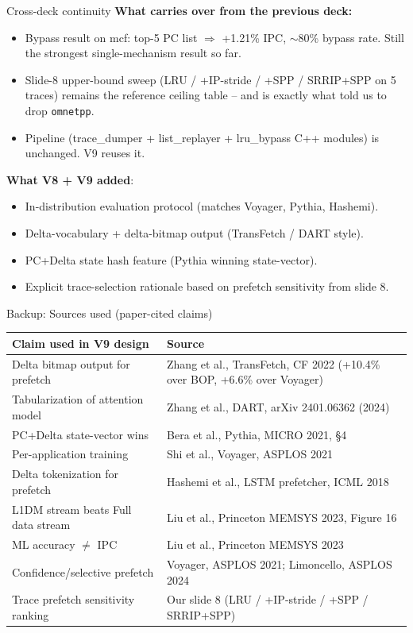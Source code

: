 \documentclass[10pt,aspectratio=169]{beamer}
\begin{document}
\begin{frame}{Cross-deck continuity}
  \footnotesize
  \textbf{What carries over from the previous deck:}
  \begin{itemize}\small
    \item Bypass result on mcf: top-5 PC list $\Rightarrow$ +1.21\% IPC, $\sim$80\% bypass rate.
      Still the strongest single-mechanism result so far.
    \item Slide-8 upper-bound sweep (LRU / +IP-stride / +SPP / SRRIP+SPP on 5 traces) remains
      the reference ceiling table -- and is exactly what told us to drop \texttt{omnetpp}.
    \item Pipeline (trace\_dumper + list\_replayer + lru\_bypass C++ modules) is unchanged.
      V9 reuses it.
  \end{itemize}

  \vspace{0.6em}
  \textbf{What V8 + V9 added}:
  \begin{itemize}\small
    \item In-distribution evaluation protocol (matches Voyager, Pythia, Hashemi).
    \item Delta-vocabulary + delta-bitmap output (TransFetch / DART style).
    \item PC+Delta state hash feature (Pythia winning state-vector).
    \item Explicit trace-selection rationale based on prefetch sensitivity from slide 8.
  \end{itemize}
\end{frame}

\begin{frame}{Backup: Sources used (paper-cited claims)}
  \scriptsize
  \begin{tabular}{ll}
    \toprule
    \textbf{Claim used in V9 design} & \textbf{Source} \\
    \midrule
    Delta bitmap output for prefetch    & Zhang et al., TransFetch, CF 2022 (+10.4\% over BOP, +6.6\% over Voyager) \\
    Tabularization of attention model   & Zhang et al., DART, arXiv 2401.06362 (2024) \\
    PC+Delta state-vector wins          & Bera et al., Pythia, MICRO 2021, \S 4 \\
    Per-application training            & Shi et al., Voyager, ASPLOS 2021 \\
    Delta tokenization for prefetch     & Hashemi et al., LSTM prefetcher, ICML 2018 \\
    L1DM stream beats Full data stream  & Liu et al., Princeton MEMSYS 2023, Figure 16 \\
    ML accuracy $\neq$ IPC              & Liu et al., Princeton MEMSYS 2023 \\
    Confidence/selective prefetch       & Voyager, ASPLOS 2021; Limoncello, ASPLOS 2024 \\
    Trace prefetch sensitivity ranking  & Our slide 8 (LRU / +IP-stride / +SPP / SRRIP+SPP) \\
    \bottomrule
  \end{tabular}
\end{frame}
\end{document}
